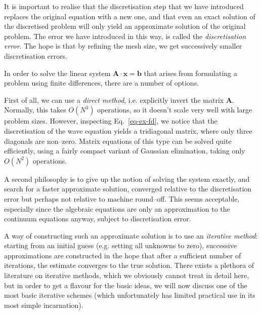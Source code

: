It is important to realise that the discretisation step that we have introduced replaces the original equation with a new one, and that even an exact solution of the discretised problem will only yield an approximate solution of the original problem. The error we have introduced in this way, is called the \emph{discretisation error}. The hope is that by refining the mesh size, we get successively smaller discretisation errors. 


\pagebreak




In order to solve the linear system ${\mathbf A}\cdot{\mathbf x}={\mathbf b}$ that arises from formulating a problem using finite differences, there are a number of options.

First of all, we can use a \emph{direct method}, i.e. explicitly invert the matrix ${\mathbf A}$. Normally, this takes $O(N^3)$ operations, so it doesn't scale very well with large problem sizes. However, inspecting Eq.~\ref{eq-ex-fd}, we notice that the discretisation of the wave equation yields a tridiagonal matrix, where only three diagonals are non--zero. Matrix equations of this type can be solved quite efficiently, using a fairly compact variant of Gaussian elimination, taking only $O(N^2)$ operations.

A second philosophy is to give up the notion of solving the system exactly, and search for a faster approximate solution, converged relative to the discretisation error but perhaps not relative to machine round--off. This seems acceptable, especially since the algebraic equations are only an approximation to the continuum equations anyway, subject to discretisation error.

A way of constructing such an approximate solution is to use an \emph{iterative method}: starting from an initial guess (e.g. setting all unknowns to zero), successive approximations  are constructed in the hope that after a sufficient number of iterations, the estimate converges to the true solution. There exists a plethora of literature on iterative methods, which we obviously cannot treat in detail here, but in order to get a flavour for the basic ideas, we will now discuss one of the most basic iterative schemes (which unfortunately has limited practical use in its most simple incarnation).


